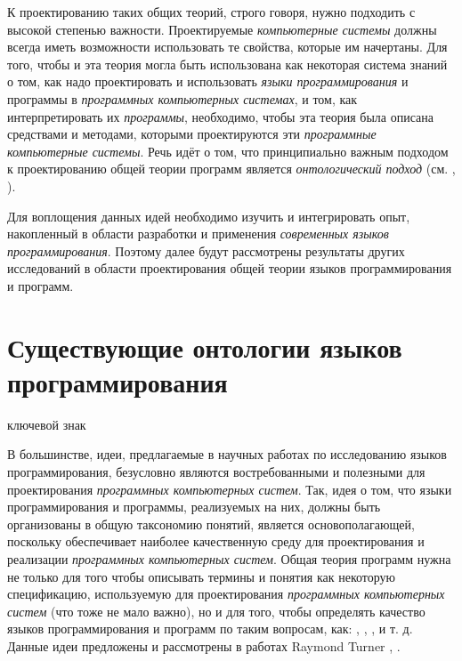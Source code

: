 К проектированию таких общих теорий, строго говоря, нужно подходить с высокой степенью важности. Проектируемые \textit{компьютерные системы} должны всегда иметь возможности использовать те свойства, которые им начертаны. Для того, чтобы и эта теория могла быть использована как некоторая система знаний о том, как надо проектировать и использовать \textit{языки программирования} и программы в \textit{программных компьютерных системах}, и том, как интерпретировать их \textit{программы}, необходимо, чтобы эта теория была описана средствами и методами, которыми проектируются эти \textit{программные компьютерные системы}. Речь идёт о том, что принципиально важным подходом к проектированию общей теории программ является \textit{онтологический подход} (см. , ).

Для воплощения данных идей необходимо изучить и интегрировать опыт, накопленный в области разработки и применения \textit{современных языков программирования}. Поэтому далее будут рассмотрены результаты других исследований в области проектирования общей теории языков программирования и программ.

\section{Существующие онтологии языков программирования}
\label{sec_programs_ontologies}

\begin{SCn}

\begin{scnrelfromlist}{ключевой знак}
\end{scnrelfromlist}
	
\end{SCn}

В большинстве, идеи, предлагаемые в научных работах по исследованию языков программирования, безусловно являются востребованными и полезными для проектирования \textit{программных компьютерных систем}. Так, идея о том, что языки программирования и программы, реализуемых на них, должны быть организованы в общую таксономию понятий, является основополагающей, поскольку обеспечивает наиболее качественную среду для проектирования и реализации \textit{программных компьютерных систем}. Общая теория программ нужна не только для того чтобы описывать термины и понятия как некоторую спецификацию, используемую для проектирования \textit{программных компьютерных систем} (что тоже не мало важно), но и для того, чтобы определять качество языков программирования и программ по таким вопросам, как: , , ,  и т. д. Данные идеи предложены и рассмотрены в работах Raymond Turner , .

